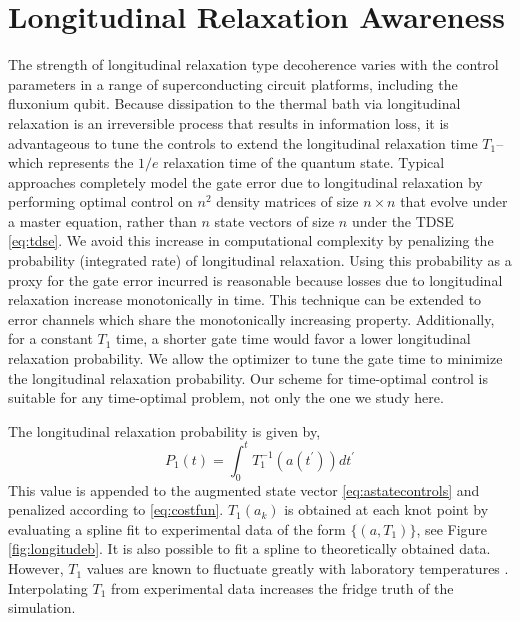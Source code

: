\section{Longitudinal Relaxation Awareness \label{sec:longitude}}
The strength of longitudinal relaxation type decoherence varies
with the control parameters in a range of superconducting circuit platforms,
including the fluxonium qubit. Because dissipation to the thermal bath
via longitudinal relaxation is an irreversible process that results in information loss,
it is advantageous to tune the controls to extend the longitudinal
relaxation time $T_{1}$--which represents the $1/e$ relaxation time
of the quantum state.
Typical approaches completely model the gate error due to longitudinal
relaxation by performing optimal control on $n^{2}$
density matrices of size $n \times n$ that evolve under a master
equation, rather than $n$ state vectors of size $n$
under the TDSE \eqref{eq:tdse}.
We avoid this increase in computational complexity by
penalizing the probability (integrated rate) of longitudinal relaxation.
Using this probability as a proxy for the gate error incurred
is reasonable because losses due to longitudinal relaxation increase monotonically
in time.
This technique can be extended to
error channels which share the monotonically increasing property.
Additionally, for a constant $T_{1}$ time, a shorter gate time
would favor a lower longitudinal relaxation probability. We allow
the optimizer to tune the gate time to minimize the
longitudinal relaxation probability. Our scheme for time-optimal
control is suitable for any time-optimal problem, not only
the one we study here.

The longitudinal relaxation probability is given by,
\begin{equation}
  P_{1}(t) = \int_{0}^{t} T_{1}^{-1}(a(t^{\prime})) dt^{\prime}
\end{equation}
This value is appended to the augmented state vector \eqref{eq:astatecontrols}
and penalized according to \eqref{eq:costfun}.
$T_{1}(a_{k})$ is obtained at each knot point by evaluating
a spline fit to experimental data of the form $\{(a, T_{1})\}$,
see Figure \ref{fig:longitudeb}.
It is also possible to fit a spline to theoretically obtained data.
However, $T_{1}$ values are known to fluctuate greatly
with laboratory temperatures \cite{klimov2018fluctuations}.
Interpolating $T_{1}$ from experimental data
increases the fridge truth of the simulation.

